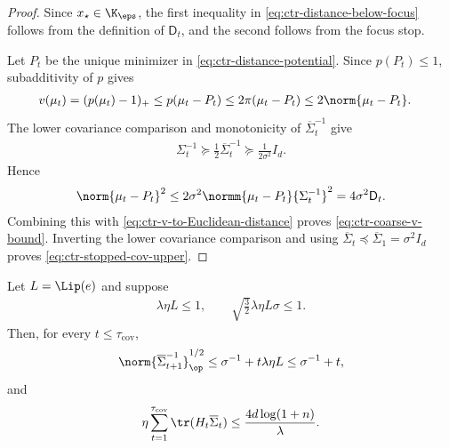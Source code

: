 \begin{proof}
    Since $x_\star\in\K_\eps$, the first inequality in
    \eqref{eq:ctr-distance-below-focus} follows from the definition of
    $\mathsf D_t$, and the second follows from the focus stop.

    Let $P_t$ be the unique minimizer in
    \eqref{eq:ctr-distance-potential}.  Since $p(P_t)\leq1$, subadditivity of
    $p$ gives
    \begin{align}
        v(\mu_t)
         & =(p(\mu_t)-1)_+
        \leq p(\mu_t-P_t)
        \leq2\pi(\mu_t-P_t)
        \leq2\norm{\mu_t-P_t}.
        \label{eq:ctr-v-to-Euclidean-distance}
    \end{align}
    The lower covariance comparison and monotonicity of
    $\overline\Sigma_t^{-1}$ give
    \begin{align}
        \Sigma_t^{-1}
        \succeq\frac12\overline\Sigma_t^{-1}
        \succeq\frac1{2\sigma^2}I_d.
    \end{align}
    Hence
    \begin{align}
        \norm{\mu_t-P_t}^2
        \leq2\sigma^2
        \normm{\mu_t-P_t}{\Sigma_t^{-1}}^2
        =4\sigma^2\mathsf D_t.
    \end{align}
    Combining this with \eqref{eq:ctr-v-to-Euclidean-distance} proves
    \eqref{eq:ctr-coarse-v-bound}.  Inverting the lower covariance comparison
    and using $\overline\Sigma_t\preceq\overline\Sigma_1=\sigma^2I_d$ proves
    \eqref{eq:ctr-stopped-cov-upper}.
\end{proof}


\begin{lemma}
    \label{lem:ctr-trace}
    Let $L=\Lip(e)$ and suppose
    \begin{align}
        \lambda\eta L\leq1,
        \qquad
        \sqrt{\frac32}\lambda\eta L\sigma\leq1.
        \label{eq:ctr-trace-hypotheses}
    \end{align}
    Then, for every $t\leq\tau_{\mathrm{cov}}$,
    \begin{align}
        \norm{\overline\Sigma_{t+1}^{-1}}_{\op}^{1/2}
        \leq\sigma^{-1}+t\lambda\eta L
        \leq\sigma^{-1}+t,
        \label{eq:ctr-trace-spectrum}
    \end{align}
    and
    \begin{align}
        \eta\sum_{t=1}^{\tau_{\mathrm{cov}}}
        \tr(H_t\overline\Sigma_t)
        \leq\frac{4d\log(1+n)}\lambda.
        \label{eq:ctr-trace-logdet}
    \end{align}
\end{lemma}

